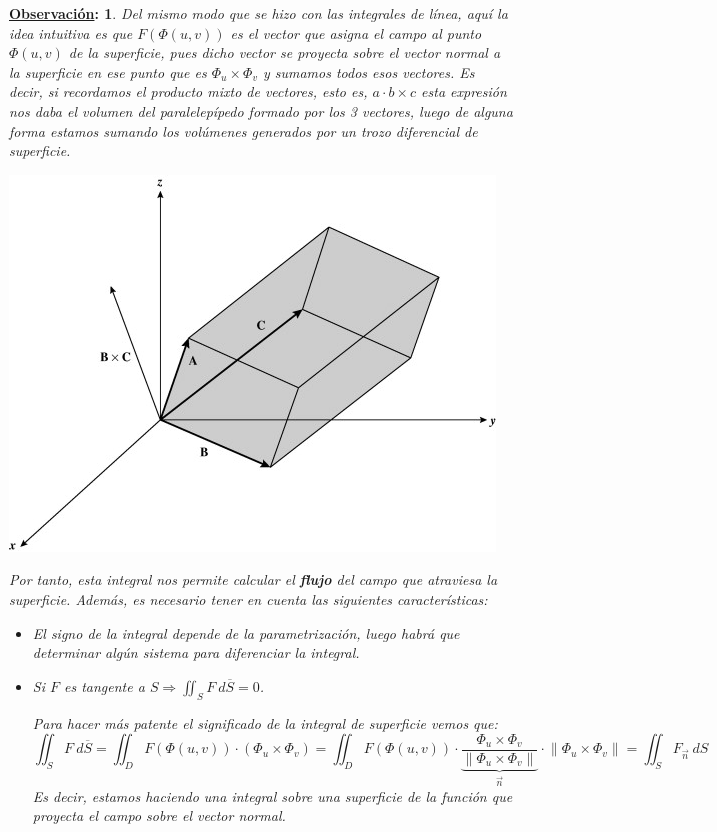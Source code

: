 \documentclass[10pt,a4paper,openright]{book}
\theoremstyle{break}
\newtheorem*{obs}{\underline{Observación}:}
\newcommand{\dif}[1]{\ d#1}
\begin{document}
\begin{obs}
Del mismo modo que se hizo con las integrales de línea, aquí la idea intuitiva es que $F\left( \Phi\left( u, v \right) \right)$ es el vector que asigna el campo al punto $\Phi\left( u, v \right)$ de la superficie, pues dicho vector se proyecta sobre el vector normal a la superficie en ese punto que es $\Phi_u \times \Phi_v$ y sumamos todos esos vectores. Es decir, si recordamos el producto mixto de vectores, esto es, $a\cdot b\times c$ esta expresión nos daba el volumen del paralelepípedo formado por los 3 vectores, luego de alguna forma estamos sumando los volúmenes generados por un trozo diferencial de superficie.
\begin{center}
    \includegraphics[scale=0.8]{tripleProduct} 
\end{center}Por tanto, esta integral nos permite calcular el \textbf{flujo} del campo que atraviesa la superficie. Además, es necesario tener en cuenta las siguientes características:
\begin{itemize}
    \item El signo de la integral depende de la parametrización, luego habrá que determinar algún sistema para diferenciar la integral.
    \item Si $F$ es tangente a $S \Rightarrow \iint_{S} F \dif{\overline{S}} = 0$.

Para hacer más patente el significado de la integral de superficie vemos que:
$$\iint_{S} F \dif{\overline{S}} = \iint_{D} F\left( \Phi\left( u, v \right) \right) \cdot \left( \Phi_u \times \Phi_v \right) = \iint_{D} F\left( \Phi\left( u, v \right) \right) \cdot \underbrace{\frac{\Phi_u \times \Phi_v}{\lVert \Phi_u \times \Phi_v \rVert}}_{\vec{n}} \cdot \lVert \Phi_u \times \Phi_v \rVert = \iint_{S} F_{\vec{n}} \dif{S}$$
Es decir, estamos haciendo una integral sobre una superficie de la función que proyecta el campo sobre el vector normal.
\end{itemize}
\end{obs}
\end{document}

